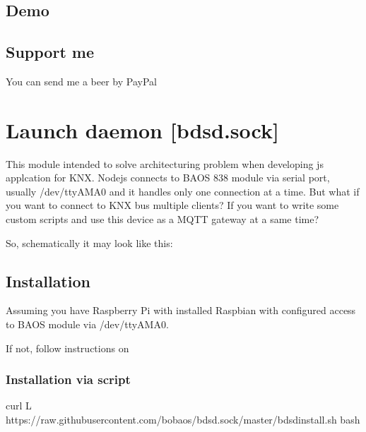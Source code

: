 \documentclass[letterpaper,10pt,english]{sphinxmanual}
\begin{document}
\section{Demo}
\label{\detokenize{bobaos:demo}}\label{\detokenize{bobaos:demo}}



\section{Support me}
\label{\detokenize{bobaos:support-me}}\label{\detokenize{bobaos:support-me}}
You can send me a beer by PayPal



\chapter{Launch daemon {[}bdsd.sock{]}}
\label{\detokenize{bdsd.sock:launch-daemon-bdsd-sock}}\label{\detokenize{bdsd.sock:launch-daemon-bdsd-sock}}\label{\detokenize{bdsd.sock::doc}}
This module intended to solve architecturing problem when developing js applcation for KNX.
Nodejs connects to BAOS 838 module via serial port, usually /dev/ttyAMA0 and it handles only one connection at a time.
But what if you want to connect to KNX bus multiple clients?
If you want to write some custom scripts and use this device as a MQTT gateway at a same time?

So, schematically it may look like this:



\section{Installation}
\label{\detokenize{bdsd.sock:installation}}\label{\detokenize{bdsd.sock:installation}}
Assuming you have Raspberry Pi with installed Raspbian with configured access to BAOS module via /dev/ttyAMA0.

If not, follow instructions on 


\subsection{Installation via script}
\label{\detokenize{bdsd.sock:installation-via-script}}\label{\detokenize{bdsd.sock:installation-via-script}}
%
\begin{sphinxVerbatim}[commandchars=\\\{\}]
\PYGZdl{} curl \PYGZhy{}L https://raw.githubusercontent.com/bobaos/bdsd.sock/master/bdsd\PYGZus{}install.sh \textbar{} bash
\end{sphinxVerbatim}
\end{document}
